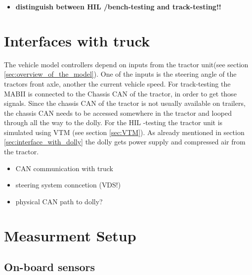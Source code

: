 \documentclass[ExampleMasters.tex]{subfiles}
\begin{document}
\begin{itemize}	
	\item \textbf{distinguish between \gls{HIL} /bench-testing and track-testing!!}
\end{itemize}

\section{Interfaces with truck}
\label{sec:interface_with_truck}
The vehicle model controllers depend on inputs from the tractor unit(see section \ref{sec:overview_of_the_model}). One of the inputs is the steering angle of the tractors front axle, another the current vehicle speed. For track-testing the \gls{MABII} is connected to the Chassis \gls{CAN} of the tractor, in order to get those signals. Since the chassis \gls{CAN} of the tractor is not usually available on trailers, the chassis \gls{CAN} needs to be accessed somewhere in the tractor and looped through all the way to the dolly.   
For the \gls{HIL} -testing the tractor unit is simulated using \gls{VTM}  (see section \ref{sec:VTM}). As already mentioned in section \ref{sec:interface_with_dolly} the dolly gets power supply and compressed air from the tractor.

\begin{itemize}
	\item \gls{CAN} communication with truck
	\item steering system conncetion (\gls{VDS}!)
	\item physical \gls{CAN} path to dolly?

\end{itemize}


\section{Measurment Setup}
\label{sec:measurement_setup}

\subsection{On-board sensors}
\end{document}
